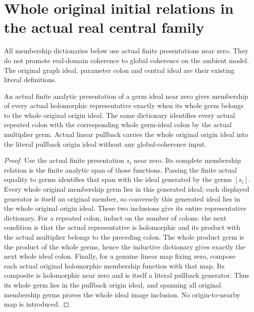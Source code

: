 \section{Whole original initial relations in the actual real central family}

All membership dictionaries below use actual finite presentations near
zero. They do not promote real-domain coherence to global coherence on
the ambient model. The original graph ideal, parameter colon and
central ideal are their existing literal definitions.

\begin{lemma}
\label{hir:real-domain-whole-origin-local-dictionary}
\leanok
An actual finite analytic presentation of a germ ideal near zero gives
membership of every actual holomorphic representative exactly when
its whole germ belongs to the whole original origin ideal. The same
dictionary identifies every actual repeated colon with the
corresponding whole germ-ideal colon by the actual multiplier germ.
Actual linear pullback carries the whole original origin ideal into
the literal pullback origin ideal without any global-coherence input.
\end{lemma}
\begin{proof}
Use the actual finite presentation $s_i$ near zero. Its complete
membership relation is the finite analytic span of those functions.
Passing the finite actual equality to germs identifies that span with
the ideal generated by the germs $[s_i]$. Every whole original
membership germ lies in this generated ideal; each displayed generator
is itself an original member, so conversely this generated ideal lies
in the whole original origin ideal. These two inclusions give its
entire representative dictionary. For a repeated colon, induct on the
number of colons: the next condition is that the actual representative
is holomorphic and its product with the actual multiplier belongs to
the preceding colon. The whole product germ is the product of the
whole germs, hence the inductive dictionary gives exactly the next
whole ideal colon. Finally, for a genuine linear map fixing zero,
compose each actual original holomorphic membership function with that
map. Its composite is holomorphic near zero and is itself a literal
pullback generator. Thus its whole germ lies in the pullback origin
ideal, and spanning all original membership germs proves the whole
ideal image inclusion. No origin-to-nearby map is introduced.
\end{proof}

